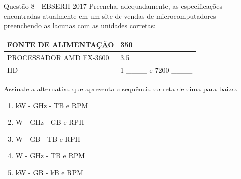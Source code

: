 \documentclass[aspectratio=169,
				xcolor=table]{beamer}
\begin{document}
	\begin{frame}{Questão 8 - EBSERH 2017}
		Preencha, adequadamente, as especificações encontradas atualmente em um site de vendas de microcomputadores preenchendo as lacunas com as unidades corretas:
		\vspace{0.5em}
		\begin{table}
			\centering
			\begin{tabular}{|ll|}
			\hline 
			FONTE DE ALIMENTAÇÃO & 350 ____ \\ 
			\hline 
			PROCESSADOR AMD FX-3600 & 3.5 ____ \\ 
			\hline 
			HD & 1 ____ e 7200 ____ \\ 
			\hline 
			\end{tabular}		
		\end{table}
 
		
		\vspace{0.5em}
		Assinale a alternativa que apresenta a sequência correta de cima para baixo. 
		\vspace{0.5em}
		\begin{enumerate}[A]
			\item kW - GHz - TB e RPM
			\item W - GHz - GB e RPH
			\item W - GB - TB e RPH
			\item W - GHz - TB e RPM
			\item kW - GB - kB e RPM
		\end{enumerate}

	\end{frame}
\end{document}
